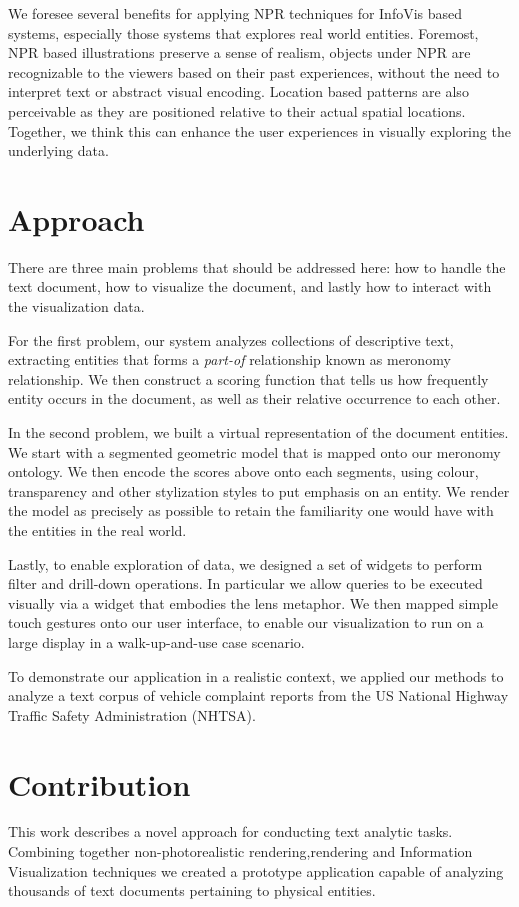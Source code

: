 We foresee several benefits for applying NPR techniques for InfoVis based
systems, especially those systems that explores real world entities. Foremost,
NPR based illustrations preserve a sense of realism, objects under NPR are
recognizable to the viewers based on their past experiences, without the need to
interpret text or abstract visual encoding. Location based patterns are also
perceivable as they are positioned relative to their actual spatial locations.
Together, we think this can enhance the user experiences in visually exploring
the underlying data.

 
\section{Approach}
There are three main problems that should be addressed here: how to handle the
text document, how to visualize the document, and lastly how to interact with
the visualization data.

For the first problem, our system analyzes collections of descriptive text,
extracting entities that forms a \emph{part-of} relationship known as meronomy
relationship. We then construct a scoring function that tells us how frequently
entity occurs in the document, as well as their relative occurrence to each
other. 
 
In the second problem, we built a virtual representation of the document
entities. We start with a segmented \threed geometric model that is mapped onto
our meronomy ontology. We then encode the scores above onto each segments, 
using colour, transparency and other stylization styles to put emphasis on  an
entity. We render the model as precisely as possible to retain the familiarity
one would have with the entities in the real world.
 
Lastly, to enable exploration of data, we designed a set of widgets to perform
filter and drill-down operations. In particular we allow queries to be executed
visually via a widget that embodies the lens metaphor. We then mapped simple
touch gestures onto our user interface, to enable our visualization to run on a
large display in a walk-up-and-use case scenario.
 
To demonstrate our application in a realistic context, we applied our methods
to analyze a text corpus of vehicle complaint reports from the US National
Highway Traffic Safety Administration (NHTSA).

 
\section{Contribution}
This work describes a novel approach for conducting text analytic tasks.
Combining together non-photorealistic rendering,\threed rendering and
Information Visualization techniques we created a prototype application capable
of analyzing thousands of text documents pertaining to physical entities.
 

